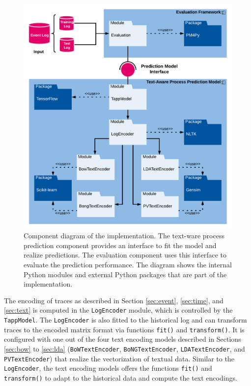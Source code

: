 \begin{figure}[htbp!]
	\centering
	\includegraphics[width=\textwidth]{figures/implementation}
	\caption[Component diagram of the implementation]{Component diagram of the implementation. The text-ware process prediction component provides an interface to fit the model and realize predictions. The evaluation component uses this interface to evaluate the prediction performance. The diagram shows the internal Python modules and external Python packages that are part of the implementation.}
	\label{fig:/implementation}
\end{figure}

The encoding of traces as described in Section \ref{sec:event}, \ref{sec:time}, and \ref{sec:text} is computed in the \texttt{LogEncoder} module, which is controlled by the \texttt{TappModel}.
The \texttt{LogEncoder} is also fitted to the historical log and can transform traces to the encoded matrix format via functions \texttt{fit()} and \texttt{transform()}.
It is configured with one out of the four text encoding models described in Sections \ref{sec:bow} to \ref{sec:lda} (\texttt{BoWTextEncoder},  \texttt{BoNGTextEncoder}, \texttt{LDATextEncoder}, and \texttt{PVTextEncoder}) that realize the vectorization of textual data.
Similar to the \texttt{LogEncoder}, the text encoding models offers the functions \texttt{fit()} and \texttt{transform()} to adapt to the historical data and compute the text encodings.


